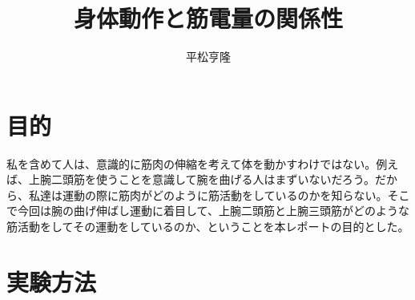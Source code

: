 \documentclass{jsarticle}
\begin{document}
\title{身体動作と筋電量の関係性}
\author{平松亨隆}
\maketitle


\section{目的}
私を含めて人は、意識的に筋肉の伸縮を考えて体を動かすわけではない。例えば、上腕二頭筋を使うことを意識して腕を曲げる人はまずいないだろう。だから、私達は運動の際に筋肉がどのように筋活動をしているのかを知らない。そこで今回は腕の曲げ伸ばし運動に着目して、上腕二頭筋と上腕三頭筋がどのような筋活動をしてその運動をしているのか、ということを本レポートの目的とした。

\section{実験方法}
\end{document}
